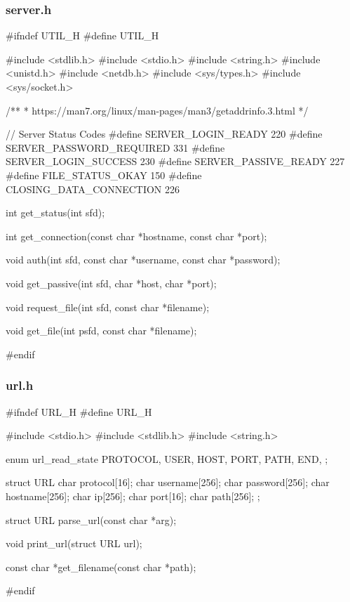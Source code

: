 \documentclass[11pt,a4paper]{article}
\begin{document}
\subsubsection{server.h}
\begin{c-darktheme}
    #ifndef UTIL_H
    #define UTIL_H
    
    #include <stdlib.h>
    #include <stdio.h>
    #include <string.h>
    #include <unistd.h>
    #include <netdb.h>
    #include <sys/types.h>
    #include <sys/socket.h>
    
    /**
     * https://man7.org/linux/man-pages/man3/getaddrinfo.3.html
     */
    
    // Server Status Codes
    #define SERVER_LOGIN_READY 220
    #define SERVER_PASSWORD_REQUIRED 331
    #define SERVER_LOGIN_SUCCESS 230
    #define SERVER_PASSIVE_READY 227
    #define FILE_STATUS_OKAY 150
    #define CLOSING_DATA_CONNECTION 226
    
    int get_status(int sfd);
    
    int get_connection(const char *hostname, const char *port);
    
    void auth(int sfd, const char *username, const char *password);
    
    void get_passive(int sfd, char *host, char *port);
    
    void request_file(int sfd, const char *filename);
    
    void get_file(int psfd, const char *filename);
    
    #endif
\end{c-darktheme}

\subsubsection{url.h}
\begin{c-darktheme}
    #ifndef URL_H
#define URL_H

#include <stdio.h>
#include <stdlib.h>
#include <string.h>

enum url_read_state
{
    PROTOCOL,
    USER,
    HOST,
    PORT,
    PATH,
    END,
};

struct URL
{
    char protocol[16];
    char username[256];
    char password[256];
    char hostname[256];
    char ip[256];
    char port[16];
    char path[256];
};

struct URL parse_url(const char *arg);

void print_url(struct URL url);

const char *get_filename(const char *path);

#endif
\end{c-darktheme}
\end{document}
